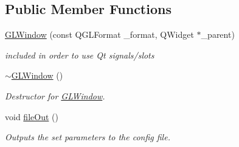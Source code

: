 \subsection*{Public Member Functions}
\begin{DoxyCompactItemize}
\item 
\hyperlink{classGLWindow_a54ae7036a8f059e9ea6a3b91064837c8}{GLWindow} (const QGLFormat \_\-format, QWidget $\ast$\_\-parent)
\begin{DoxyCompactList}\small\item\em included in order to use Qt signals/slots \item\end{DoxyCompactList}\item 
\hyperlink{classGLWindow_a2eeaea2148f4f72344edd6d1bac9759b}{$\sim$GLWindow} ()
\begin{DoxyCompactList}\small\item\em Destructor for \hyperlink{classGLWindow}{GLWindow}. \item\end{DoxyCompactList}\item 
void \hyperlink{classGLWindow_aaa661493b1dfd67faa3189e5f6cd248c}{fileOut} ()
\begin{DoxyCompactList}\small\item\em Outputs the set parameters to the config file. \item\end{DoxyCompactList}\end{DoxyCompactItemize}
